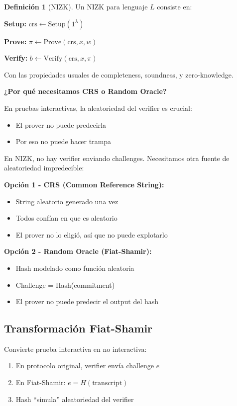 \documentclass[11pt,a4paper,twoside,openright]{book}
\theoremstyle{definition}
\newtheorem{definition}{Definición}[chapter]
\theoremstyle{plain}
\theoremstyle{remark}
\begin{document}
\begin{definition}[NIZK]
Un NIZK para lenguaje $L$ consiste en:

\textbf{Setup:} $\text{crs} \leftarrow \text{Setup}(1^\lambda)$

\textbf{Prove:} $\pi \leftarrow \text{Prove}(\text{crs}, x, w)$

\textbf{Verify:} $b \leftarrow \text{Verify}(\text{crs}, x, \pi)$

Con las propiedades usuales de completeness, soundness, y zero-knowledge.
\end{definition}

\begin{keyidea}
\textbf{¿Por qué necesitamos CRS o Random Oracle?}

En pruebas interactivas, la aleatoriedad del verifier es crucial:
\begin{itemize}
    \item El prover no puede predecirla
    \item Por eso no puede hacer trampa
\end{itemize}

En NIZK, no hay verifier enviando challenges. Necesitamos otra fuente de aleatoriedad impredecible:

\textbf{Opción 1 - CRS (Common Reference String):}
\begin{itemize}
    \item String aleatorio generado una vez
    \item Todos confían en que es aleatorio
    \item El prover no lo eligió, así que no puede explotarlo
\end{itemize}

\textbf{Opción 2 - Random Oracle (Fiat-Shamir):}
\begin{itemize}
    \item Hash modelado como función aleatoria
    \item Challenge = Hash(commitment)
    \item El prover no puede predecir el output del hash
\end{itemize}
\end{keyidea}

\subsection{Transformación Fiat-Shamir}

Convierte prueba interactiva en no interactiva:
\begin{enumerate}
    \item En protocolo original, verifier envía challenge $e$
    \item En Fiat-Shamir: $e = H(\text{transcript})$
    \item Hash ``simula'' aleatoriedad del verifier
\end{enumerate}
\end{document}
